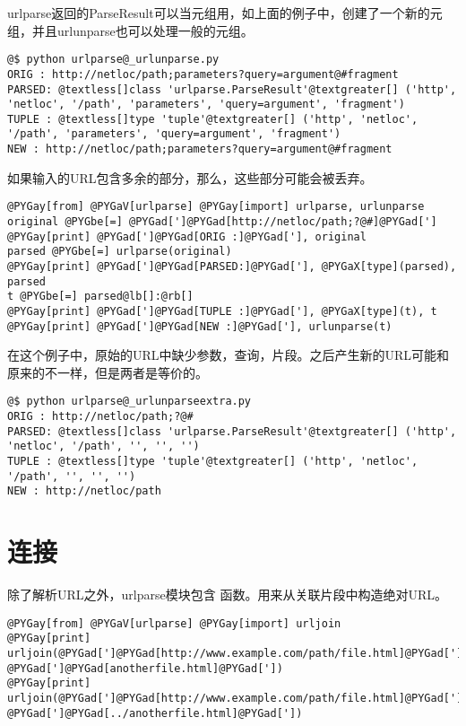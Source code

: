 \documentclass[a4paper,10pt,english]{manual}
\begin{document}
urlparse返回的ParseResult可以当元组用，如上面的例子中，创建了一个新的元组，并且urlunparse也可以处理一般的元组。

\begin{Verbatim}[commandchars=@\[\]]
@$ python urlparse@_urlunparse.py
ORIG : http://netloc/path;parameters?query=argument@#fragment
PARSED: @textless[]class 'urlparse.ParseResult'@textgreater[] ('http', 'netloc', '/path', 'parameters', 'query=argument', 'fragment')
TUPLE : @textless[]type 'tuple'@textgreater[] ('http', 'netloc', '/path', 'parameters', 'query=argument', 'fragment')
NEW : http://netloc/path;parameters?query=argument@#fragment
\end{Verbatim}

如果输入的URL包含多余的部分，那么，这些部分可能会被丢弃。

\begin{Verbatim}[commandchars=@\[\]]
@PYGay[from] @PYGaV[urlparse] @PYGay[import] urlparse, urlunparse
original @PYGbe[=] @PYGad[']@PYGad[http://netloc/path;?@#]@PYGad[']
@PYGay[print] @PYGad[']@PYGad[ORIG :]@PYGad['], original
parsed @PYGbe[=] urlparse(original)
@PYGay[print] @PYGad[']@PYGad[PARSED:]@PYGad['], @PYGaX[type](parsed), parsed
t @PYGbe[=] parsed@lb[]:@rb[]
@PYGay[print] @PYGad[']@PYGad[TUPLE :]@PYGad['], @PYGaX[type](t), t
@PYGay[print] @PYGad[']@PYGad[NEW :]@PYGad['], urlunparse(t)
\end{Verbatim}

在这个例子中，原始的URL中缺少参数，查询，片段。之后产生新的URL可能和原来的不一样，但是两者是等价的。

\begin{Verbatim}[commandchars=@\[\]]
@$ python urlparse@_urlunparseextra.py
ORIG : http://netloc/path;?@#
PARSED: @textless[]class 'urlparse.ParseResult'@textgreater[] ('http', 'netloc', '/path', '', '', '')
TUPLE : @textless[]type 'tuple'@textgreater[] ('http', 'netloc', '/path', '', '', '')
NEW : http://netloc/path
\end{Verbatim}


\section{连接}

除了解析URL之外，urlparse模块包含  函数。用来从关联片段中构造绝对URL。

\begin{Verbatim}[commandchars=@\[\]]
@PYGay[from] @PYGaV[urlparse] @PYGay[import] urljoin
@PYGay[print] urljoin(@PYGad[']@PYGad[http://www.example.com/path/file.html]@PYGad['], @PYGad[']@PYGad[anotherfile.html]@PYGad['])
@PYGay[print] urljoin(@PYGad[']@PYGad[http://www.example.com/path/file.html]@PYGad['], @PYGad[']@PYGad[../anotherfile.html]@PYGad['])
\end{Verbatim}
\end{document}
